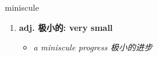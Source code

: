 
\begin{frame}
{\huge miniscule}
\begin{center}
\begin{enumerate}\Large
  \item \textbf{adj. 极小的: very small}
  \begin{itemize}
    \item \em{\Large{a miniscule progress 极小的进步}}
  \end{itemize}
\end{enumerate}
\end{center}
\end{frame}
